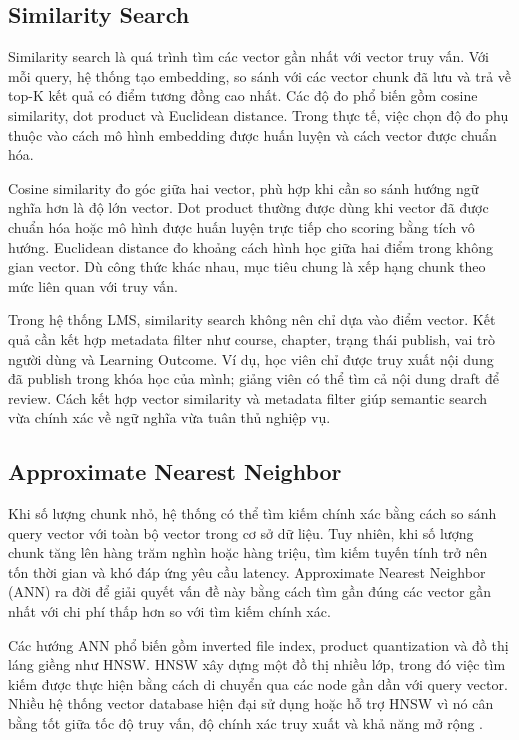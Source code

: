 \subsection{Similarity Search}
\label{subsec:similarity-search}

Similarity search là quá trình tìm các vector gần nhất với vector truy vấn. Với
mỗi query, hệ thống tạo embedding, so sánh với các vector chunk đã lưu và trả về
top-K kết quả có điểm tương đồng cao nhất. Các độ đo phổ biến gồm cosine
similarity, dot product và Euclidean distance. Trong thực tế, việc chọn độ đo
phụ thuộc vào cách mô hình embedding được huấn luyện và cách vector được chuẩn
hóa.

Cosine similarity đo góc giữa hai vector, phù hợp khi cần so sánh hướng ngữ
nghĩa hơn là độ lớn vector. Dot product thường được dùng khi vector đã được
chuẩn hóa hoặc mô hình được huấn luyện trực tiếp cho scoring bằng tích vô hướng.
Euclidean distance đo khoảng cách hình học giữa hai điểm trong không gian vector.
Dù công thức khác nhau, mục tiêu chung là xếp hạng chunk theo mức liên quan với
truy vấn.

Trong hệ thống LMS, similarity search không nên chỉ dựa vào điểm vector. Kết quả
cần kết hợp metadata filter như course, chapter, trạng thái publish, vai trò
người dùng và Learning Outcome. Ví dụ, học viên chỉ được truy xuất nội dung đã
publish trong khóa học của mình; giảng viên có thể tìm cả nội dung draft để
review. Cách kết hợp vector similarity và metadata filter giúp semantic search
vừa chính xác về ngữ nghĩa vừa tuân thủ nghiệp vụ.

\subsection{Approximate Nearest Neighbor}
\label{subsec:approximate-nearest-neighbor}

Khi số lượng chunk nhỏ, hệ thống có thể tìm kiếm chính xác bằng cách so sánh
query vector với toàn bộ vector trong cơ sở dữ liệu. Tuy nhiên, khi số lượng
chunk tăng lên hàng trăm nghìn hoặc hàng triệu, tìm kiếm tuyến tính trở nên tốn
thời gian và khó đáp ứng yêu cầu latency. Approximate Nearest Neighbor (ANN) ra
đời để giải quyết vấn đề này bằng cách tìm gần đúng các vector gần nhất với chi
phí thấp hơn so với tìm kiếm chính xác.

Các hướng ANN phổ biến gồm inverted file index, product quantization và đồ thị
láng giềng như HNSW. HNSW xây dựng một đồ thị nhiều lớp, trong đó việc tìm kiếm
được thực hiện bằng cách di chuyển qua các node gần dần với query vector. Nhiều
hệ thống vector database hiện đại sử dụng hoặc hỗ trợ HNSW vì nó cân bằng tốt
giữa tốc độ truy vấn, độ chính xác truy xuất và khả năng mở rộng
\cite{malkov2018hnsw,johnson2019faiss}.

